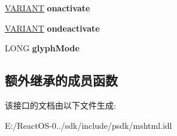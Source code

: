 \begin{DoxyCompactItemize}
\hyperlink{structtag_v_a_r_i_a_n_t}{V\+A\+R\+I\+A\+NT} {\bfseries onactivate}
\item 
\mbox{\label{interface_m_s_h_t_m_l_1_1_i_h_t_m_l_element3_af36ffe1b8bc09ff7e99cad599a57dd22}} 
\hyperlink{structtag_v_a_r_i_a_n_t}{V\+A\+R\+I\+A\+NT} {\bfseries ondeactivate}
\item 
\mbox{\label{interface_m_s_h_t_m_l_1_1_i_h_t_m_l_element3_a27f5a71be396d03a4d8e1996652ab836}} 
L\+O\+NG {\bfseries glyph\+Mode}
\end{DoxyCompactItemize}
\subsection*{额外继承的成员函数}


该接口的文档由以下文件生成\+:\begin{DoxyCompactItemize}
\item 
E\+:/\+React\+O\+S-\/0../sdk/include/psdk/mshtml.\+idl\end{DoxyCompactItemize}
